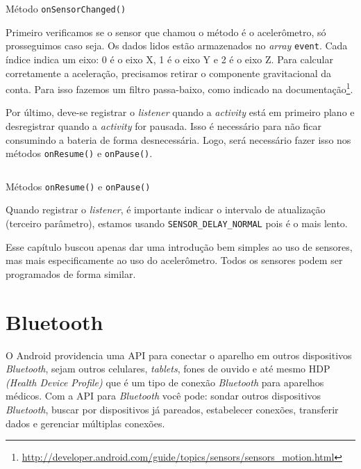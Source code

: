 \documentclass[a4paper,12pt,brazil,oneside]{book}
\begin{document}
\begin{singlespace}
	\begin{listing}[H]
	\inputminted[linenos=true,fontsize=\small,frame=lines, framesep=2mm, tabsize=2,numbersep=5pt]{java}{src/api/accelerometer/listener.java}
	\caption{Método \texttt{onSensorChanged()}}
	\label{code:accelonsensorchanged}
	\end{listing} 			
	
	Primeiro verificamos se o sensor que chamou o método é o acelerômetro, só prosseguimos caso seja. Os dados lidos estão armazenados no \emph{array} \texttt{event}. Cada índice indica um eixo: 0 é o eixo X, 1 é o eixo Y e 2 é o eixo Z. Para calcular corretamente a aceleração, precisamos retirar o componente gravitacional da conta. Para isso fazemos um filtro passa-baixo, como indicado na documentação\footnote{\href{http://developer.android.com/guide/topics/sensors/sensors\_motion.html}{http://developer.android.com/guide/topics/sensors/sensors\_motion.html}}.

	Por último, deve-se registrar o \emph{listener} quando a \emph{activity} está em primeiro plano e desregistrar quando a \emph{activity} for pausada. Isso é necessário para não ficar consumindo a bateria de forma desnecessária. Logo, será necessário fazer isso nos métodos \texttt{onResume()} e \texttt{onPause()}.

	\begin{listing}[H]
	\inputminted[linenos=true,fontsize=\small,frame=lines, framesep=2mm, tabsize=2,numbersep=5pt]{java}{src/api/accelerometer/register.java}
	\caption{Métodos \texttt{onResume()} e \texttt{onPause()}}
	\label{code:accelregister}
	\end{listing} 			

	Quando registrar o \emph{listener}, é importante indicar o intervalo de atualização (terceiro parâmetro), estamos usando \texttt{SENSOR\_DELAY\_NORMAL} pois é o mais lento. 
	
	Esse capítulo buscou apenas dar uma introdução bem simples ao uso de sensores, mas mais especificamente ao uso do acelerômetro. Todos os sensores podem ser programados de forma similar. 

\chapter{Bluetooth}

	O Android providencia uma API para conectar o aparelho em outros dispositivos \emph{Bluetooth}, sejam outros celulares, \emph{tablets}, fones de ouvido e até mesmo HDP \emph{(Health Device Profile)} que é um tipo de conexão \emph{Bluetooth} para aparelhos médicos. Com a API para \emph{Bluetooth} você pode: sondar outros dispositivos \emph{Bluetooth}, buscar por dispositivos já pareados, estabelecer conexões, transferir dados e gerenciar múltiplas conexões.


\end{singlespace}
\end{document}
